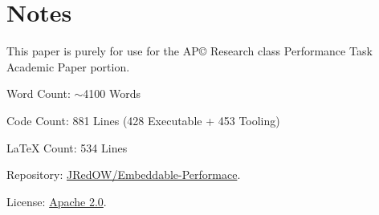 \section*{Notes}
This paper is purely for use for the AP© Research class Performance Task Academic Paper portion.

Word Count: $\sim$4100 Words

Code Count: 881 Lines (428 Executable + 453 Tooling)

LaTeX Count: 534 Lines

Repository: \href{https://github.com/JRedOW/Embeddable-Performace}{JRedOW/Embeddable-Performace}.

License: \href{https://github.com/JRedOW/Embeddable-Performace/blob/main/LICENSE}{Apache 2.0}.

